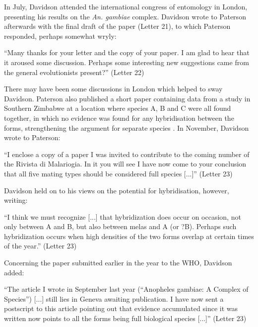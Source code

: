 \documentclass[a4paper,11pt,abstracton,hidelinks]{scrartcl}
\begin{document}
In July, Davidson attended the international congress of entomology in London, presenting his results on the \textit{An. gambiae} complex. Davidson wrote to Paterson afterwards with the final draft of the paper (Letter 21), to which Paterson responded, perhaps somewhat wryly:


\begin{displayquote}
``Many thanks for your letter and the copy of your paper. I am glad to hear that it aroused some discussion. Perhaps some interesting new suggestions came from the general evolutionists present?'' (Letter 22)
\end{displayquote}


There may have been some discussions in London which helped to sway Davidson. Paterson also published a short paper containing data from a study in Southern Zimbabwe at a location where species A, B and C were all found together, in which no evidence was found for any hybridisation between the forms, strengthening the argument for separate species \citep{Paterson1964}. In November, Davidson wrote to Paterson:


\begin{displayquote}
``I enclose a copy of a paper I was invited to contribute to the coming number of the Rivista di Malariogia. In it you will see I have now come to your conclusion that all five mating types should be considered full species [...]'' (Letter 23)
\end{displayquote}


Davidson held on to his views on the potential for hybridisation, however, writing:


\begin{displayquote}
``I think we must recognize [...] that hybridization does occur on occasion, not only between A and B, but also between melas and A (or ?B). Perhaps such hybridization occurs when high densities of the two forms overlap at certain times of the year.'' (Letter 23)
\end{displayquote}


Concerning the paper submitted earlier in the year to the WHO, Davidson added:


\begin{displayquote}
``The article I wrote in September last year (``Anopheles gambiae: A Complex of Species'') [...] still lies in Geneva awaiting publication. I have now sent a postscript to this article pointing out that evidence accumulated since it was written now points to all the forms being full biological species [...]'' (Letter 23)
\end{displayquote}
\end{document}

